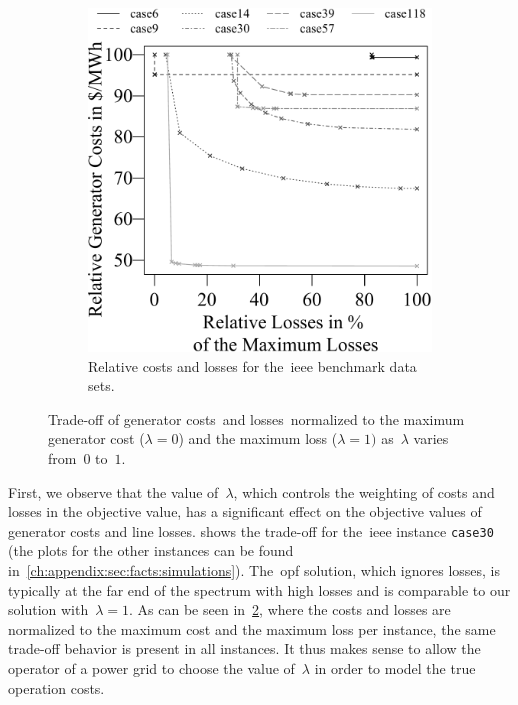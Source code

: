 \begin{figure}[t!]
\begin{subfigure}[t]{.492\textwidth}
         \includegraphics[width=\plotscale\linewidth, page=1,trim=0cm 0cm 0cm 0cm]{factsplacement/plots/plotCostsVsLossesNormalized.pdf}
     \caption{Relative costs and losses for the~\gls{ieee} benchmark data
     sets.}
     \label{ch:facts:fig:plot-costs-losses-normalized}
    \end{subfigure}
    \caption[Trade-off of generator costs~\gencost and losses~\losscost]{Trade-off
        of generator costs~\gencost and losses~\losscost normalized to the
        maximum generator cost ($\lambda = 0$) and the maximum loss ($\lambda =
        1)$ as~$\lambda$ varies from~$0$ to~$1$.}
\end{figure}

First, we observe that the value of~$\lambda$, which controls the weighting of
costs and losses in the objective value, has a significant effect on the
objective values of generator costs and line losses.
 shows the
trade-off for the~\gls{ieee} instance \texttt{case30} (the plots for the
other instances can be found in~\cref{ch:appendix:sec:facts:simulations}).
The~\gls{opf} solution, which ignores losses, is typically at the far end
of the spectrum with high losses and is comparable to our solution
with~$\lambda = 1$.  As can be seen
in~\cref{ch:facts:fig:plot-costs-losses-normalized}, where the costs and losses
are normalized to the maximum cost and the maximum loss per instance, the same
trade-off behavior is present in all instances.  It thus makes sense to allow
the operator of a power grid to choose the value of~$\lambda$ in order to model
the true operation costs.

